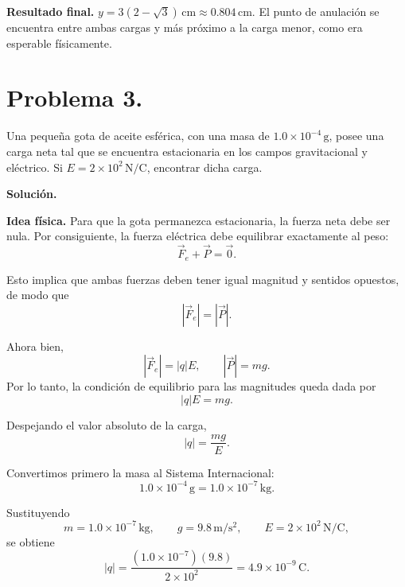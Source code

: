 \documentclass[11pt]{article}
\newcommand{\soluciontitulo}{%
  \par\medskip
  \noindent\textbf{Solución.}\par
  \smallskip
}
\newcommand{\resultadofinal}[1]{%
  \par\medskip
  \noindent\textbf{Resultado final.} #1\par
}
\begin{document}
\resultadofinal{$\boxed{y=3(2-\sqrt{3})\,\mathrm{cm}\approx 0.804\,\mathrm{cm}.}$ El punto de anulación se encuentra entre ambas cargas y más próximo a la carga menor, como era esperable físicamente.}

\clearpage

\section*{Problema 3.}
Una pequeña gota de aceite esférica, con una masa de $1.0\times 10^{-4}\,\mathrm{g}$, posee una carga neta tal que se encuentra estacionaria en los campos gravitacional y eléctrico. Si $E=2\times 10^2\,\mathrm{N/C}$, encontrar dicha carga.

\soluciontitulo

\textbf{Idea física.} Para que la gota permanezca estacionaria, la fuerza neta debe ser nula. Por consiguiente, la fuerza eléctrica debe equilibrar exactamente al peso:
\begin{equation*}
\vec F_e+\vec P=\vec 0.
\end{equation*}

Esto implica que ambas fuerzas deben tener igual magnitud y sentidos opuestos, de modo que
\begin{equation*}
|\vec F_e|=|\vec P|.
\end{equation*}

Ahora bien,
\begin{equation*}
|\vec F_e|=|q|E,
\qquad
|\vec P|=mg.
\end{equation*}
Por lo tanto, la condición de equilibrio para las magnitudes queda dada por
\begin{equation*}
|q|E=mg.
\end{equation*}

Despejando el valor absoluto de la carga,
\begin{equation*}
|q|=\frac{mg}{E}.
\end{equation*}

Convertimos primero la masa al Sistema Internacional:
\begin{equation*}
1.0\times 10^{-4}\,\mathrm{g}=1.0\times 10^{-7}\,\mathrm{kg}.
\end{equation*}

Sustituyendo
\begin{equation*}
m=1.0\times 10^{-7}\,\mathrm{kg},
\qquad
g=9.8\,\mathrm{m/s^2},
\qquad
E=2\times 10^2\,\mathrm{N/C},
\end{equation*}
se obtiene
\begin{equation*}
|q|
=
\frac{(1.0\times 10^{-7})(9.8)}{2\times 10^2}
=
4.9\times 10^{-9}\,\mathrm{C}.
\end{equation*}
\end{document}
